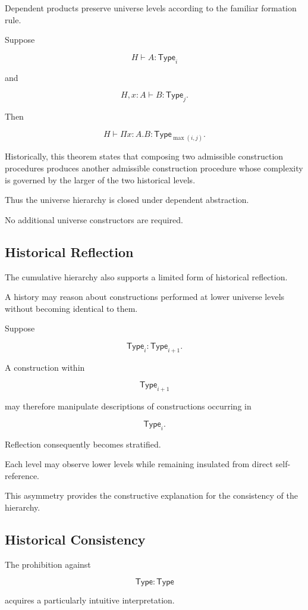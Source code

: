 \documentclass[12pt,oneside]{article}
\theoremstyle{definition}
\theoremstyle{remark}
\newcommand{\Type}{\mathsf{Type}}
\begin{document}
Dependent products preserve universe levels according to the familiar formation
rule.

Suppose

\[
H
\vdash
A
:
\Type_i
\]

and

\[
H,
x:A
\vdash
B
:
\Type_j.
\]

Then

\[
H
\vdash
\Pi
x:A.
B
:
\Type_{\max(i,j)}.
\]

Historically, this theorem states that composing two admissible construction
procedures produces another admissible construction procedure whose complexity
is governed by the larger of the two historical levels.

Thus the universe hierarchy is closed under dependent abstraction.

No additional universe constructors are required.

\subsection{Historical Reflection}

The cumulative hierarchy also supports a limited form of historical reflection.

A history may reason about constructions performed at lower universe levels
without becoming identical to them.

Suppose

\[
\Type_i
:
\Type_{i+1}.
\]

A construction within

\[
\Type_{i+1}
\]

may therefore manipulate descriptions of constructions occurring in

\[
\Type_i.
\]

Reflection consequently becomes stratified.

Each level may observe lower levels while remaining insulated from direct
self-reference.

This asymmetry provides the constructive explanation for the consistency of the
hierarchy.

\subsection{Historical Consistency}

The prohibition against

\[
\Type:\Type
\]

acquires a particularly intuitive interpretation.
\end{document}
